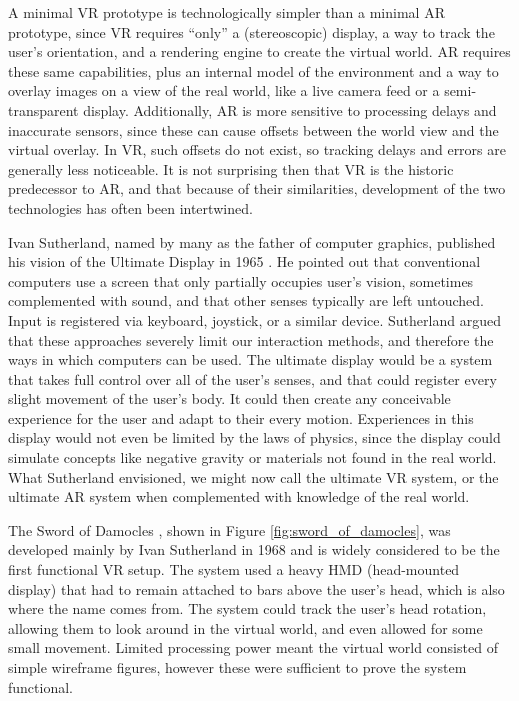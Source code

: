 A minimal VR prototype is technologically simpler than a minimal AR prototype, since VR requires ``only'' a (stereoscopic) display, a way to track the user's orientation, and a rendering engine to create the virtual world. AR requires these same capabilities, plus an internal model of the environment and a way to overlay images on a view of the real world, like a live camera feed or a semi-transparent display. Additionally, AR is more sensitive to processing delays and inaccurate sensors, since these can cause offsets between the world view and the virtual overlay. In VR, such offsets do not exist, so tracking delays and errors are generally less noticeable. It is not surprising then that VR is the historic predecessor to AR, and that because of their similarities, development of the two technologies has often been intertwined.

Ivan Sutherland, named by many as the father of computer graphics, published his vision of the Ultimate Display in 1965 \cite{sutherland1965ultimate}. He pointed out that conventional computers use a screen that only partially occupies user's vision, sometimes complemented with sound, and that other senses typically are left untouched. Input is registered via keyboard, joystick, or a similar device. Sutherland argued that these approaches severely limit our interaction methods, and therefore the ways in which computers can be used. The ultimate display would be a system that takes full control over all of the user's senses, and that could register every slight movement of the user's body. It could then create any conceivable experience for the user and adapt to their every motion. Experiences in this display would not even be limited by the laws of physics, since the display could simulate concepts like negative gravity or materials not found in the real world. What Sutherland envisioned, we might now call the ultimate VR system, or the ultimate AR system when complemented with knowledge of the real world.

The Sword of Damocles \cite{sutherland1968head}, shown in Figure \ref{fig:sword_of_damocles}, was developed mainly by Ivan Sutherland in 1968 and is widely considered to be the first functional VR setup. The system used a heavy HMD (head-mounted display) that had to remain attached to bars above the user's head, which is also where the name comes from. The system could track the user's head rotation, allowing them to look around in the virtual world, and even allowed for some small movement. Limited processing power meant the virtual world consisted of simple wireframe figures, however these were sufficient to prove the system functional.

